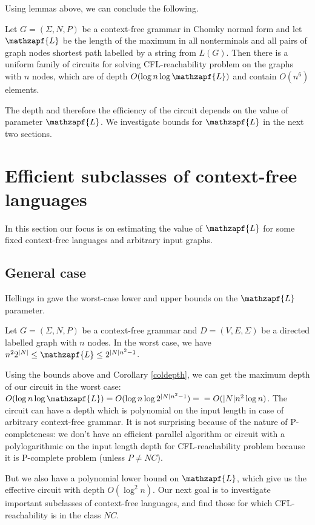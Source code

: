 Using lemmas above, we can conclude the following.
\begin{corollary}
\label{coldepth}
Let $G = (\Sigma, N, P)$ be a context-free grammar in Chomky normal form and let $\mathzapf{L}$ be the length of the maximum in all nonterminals and all pairs of graph nodes shortest path labelled by a string from $L(G)$. Then there is a uniform family of circuits for solving CFL-reachability problem on the graphs with $n$ nodes, which are of depth $O(\log n \log \mathzapf{L})$ and contain $O(n^6)$ elements.
\end{corollary}


The depth and therefore the efficiency of the circuit depends on the value of parameter $\mathzapf{L}$. We investigate bounds for $\mathzapf{L}$ in the next two sections.

\section{Efficient subclasses of context-free languages}
\label{sec:CF}
In this section our focus is on estimating the value of $\mathzapf{L}$ for some fixed context-free languages and arbitrary input graphs. 
\subsection{General case}
Hellings in \cite{HellingsCFPQ} gave the worst-case lower and upper bounds on the $\mathzapf{L}$ parameter.
\begin{theorem}[Hellings]
Let  $G = (\Sigma, N, P)$ be a context-free grammar and $D=(V, E, \Sigma)$ be a directed labelled graph with $n$ nodes. In the worst case, we have $ n^22^{|N|}\le \mathzapf{L} \le 2^{|N|n^2-1}$.
\end{theorem}


Using the bounds above and Corollary \ref{coldepth}, we can get the maximum depth of our circuit in the worst case: 
$O(\log n \log \mathzapf{L}) = O(\log n \log 2^{|N|n^2-1}) = \\ = O(|N|n^2\log n)$. The circuit can have a depth which is polynomial on the input length in case of arbitrary context-free grammar. It is not surprising because of the nature of P-completeness: we don't have an efficient parallel algorithm or circuit with a polylogarithmic on the input length depth for CFL-reachability problem because it is P-complete problem (unless $P \neq NC$).


But we also have a polynomial lower bound on $\mathzapf{L}$, which give us the effective circuit with depth $O(\log^2 n)$. Our next goal is to investigate important subclasses of context-free languages, and find those for which CFL-reachability is in the class $NC$.
